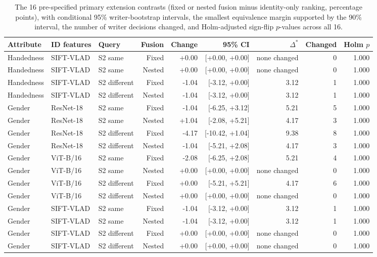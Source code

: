 \documentclass[10pt,a4paper]{article}
\begin{document}
\begin{table}[ht]
\caption{The 16 pre-specified primary extension contrasts (fixed or nested fusion minus identity-only ranking, percentage points), with conditional 95\% writer-bootstrap intervals, the smallest equivalence margin supported by the 90\% interval, the number of writer decisions changed, and Holm-adjusted sign-flip $p$-values across all 16.}\label{tab:p2tests}
\centering\footnotesize\setlength{\tabcolsep}{3.5pt}
\begin{tabular}{lllrrrrrr}\toprule
Attribute & ID features & Query & Fusion & Change & 95\% CI & $\Delta^*$ & Changed & Holm $p$\\\midrule
Handedness & SIFT-VLAD & S2 same & Fixed & +0.00 & [+0.00, +0.00] & none changed & 0 & 1.000 \\
Handedness & SIFT-VLAD & S2 same & Nested & +0.00 & [+0.00, +0.00] & none changed & 0 & 1.000 \\
Handedness & SIFT-VLAD & S2 different & Fixed & -1.04 & [-3.12, +0.00] & 3.12 & 1 & 1.000 \\
Handedness & SIFT-VLAD & S2 different & Nested & -1.04 & [-3.12, +0.00] & 3.12 & 1 & 1.000 \\
Gender & ResNet-18 & S2 same & Fixed & -1.04 & [-6.25, +3.12] & 5.21 & 5 & 1.000 \\
Gender & ResNet-18 & S2 same & Nested & +1.04 & [-2.08, +5.21] & 4.17 & 3 & 1.000 \\
Gender & ResNet-18 & S2 different & Fixed & -4.17 & [-10.42, +1.04] & 9.38 & 8 & 1.000 \\
Gender & ResNet-18 & S2 different & Nested & -1.04 & [-5.21, +2.08] & 4.17 & 3 & 1.000 \\
Gender & ViT-B/16 & S2 same & Fixed & -2.08 & [-6.25, +2.08] & 5.21 & 4 & 1.000 \\
Gender & ViT-B/16 & S2 same & Nested & +0.00 & [+0.00, +0.00] & none changed & 0 & 1.000 \\
Gender & ViT-B/16 & S2 different & Fixed & +0.00 & [-5.21, +5.21] & 4.17 & 6 & 1.000 \\
Gender & ViT-B/16 & S2 different & Nested & +0.00 & [+0.00, +0.00] & none changed & 0 & 1.000 \\
Gender & SIFT-VLAD & S2 same & Fixed & -1.04 & [-3.12, +0.00] & 3.12 & 1 & 1.000 \\
Gender & SIFT-VLAD & S2 same & Nested & -1.04 & [-3.12, +0.00] & 3.12 & 1 & 1.000 \\
Gender & SIFT-VLAD & S2 different & Fixed & +0.00 & [+0.00, +0.00] & none changed & 0 & 1.000 \\
Gender & SIFT-VLAD & S2 different & Nested & +0.00 & [+0.00, +0.00] & none changed & 0 & 1.000 \\
\bottomrule
\end{tabular}
\end{table}
\end{document}
